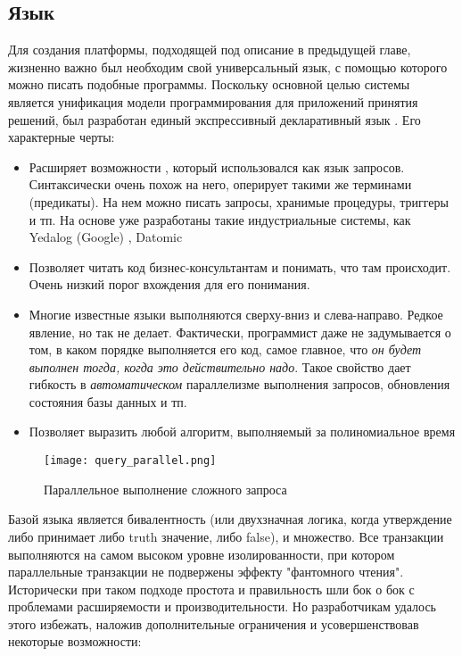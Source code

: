 \subsection{Язык \logiql}
\label{sec:technology:logiql}

Для создания платформы, подходящей под описание в предыдущей главе, жизненно важно был необходим свой универсальный язык, с помощью которого можно писать подобные программы. Поскольку основной целью системы является унификация модели программирования для приложений принятия решений, был  разработан единый экспрессивный декларативный  язык \logiql. Его характерные черты:

\begin{itemize}
  \item Расширяет возможности \datalog, который использовался как язык запросов. Синтаксически очень похож на него, оперирует такими же терминами (предикаты). На нем можно писать запросы, хранимые процедуры, триггеры и тп. На основе \datalog уже разработаны такие индустриальные системы, как Yedalog (Google) \cite{yedalog}, Datomic \cite{datomic}
  \item Позволяет читать код бизнес-консультантам и понимать, что там происходит. Очень низкий порог вхождения для его понимания.
  \item Многие известные языки выполняются сверху-вниз и слева-направо. Редкое явление, но \logiql так не делает. Фактически, программист даже не задумывается о том, в каком порядке выполняется его код, самое главное, что \emph{он будет выполнен тогда, когда это действительно надо}. Такое свойство дает гибкость в \emph{автоматическом} параллелизме выполнения запросов, обновления состояния базы данных и тп.
  \item Позволяет выразить любой алгоритм, выполняемый за полиномиальное время \cite{languages_for_np_problems}
\end{itemize}

\begin{figure}
	\centering
	\texttt{[image: query\_parallel.png]}
	\caption{Параллельное выполнение сложного запроса \cite{query_parallel_execution}}
	\label{fig:technology:logiql:query_parallel}
\end{figure}

Базой языка является бивалентность (или двухзначная логика, когда утверждение либо принимает либо truth значение, либо false), и множество. Все транзакции выполняются на самом высоком уровне изолированности, при котором параллельные транзакции не подвержены эффекту "фантомного чтения". Исторически при таком подходе простота и правильность шли бок о бок с проблемами расширяемости и производительности. Но разработчикам \logiql удалось этого избежать, наложив дополнительные ограничения и усовершенствовав некоторые возможности:

